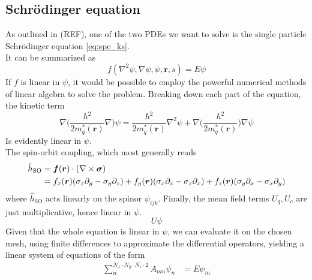 \subsection{Schr\"odinger equation}
As outlined in (REF), one of the two PDEs we want to solve is the single particle Schr\"odinger equation \ref{eq:spe_ks}.
\\It can be summarized as
\begin{equation}
    \label{eq:pde} f(\nabla^2 \psi, \nabla \psi, \psi, \bm r, s) = E\psi
\end{equation}
If $f$ is linear in $\psi$, it would be possible to employ the powerful numerical methods of linear algebra to solve the problem.
Breaking down each part of the equation, the kinetic term
\begin{equation}
\label{eq:kin_lin_dim}
\nabla\bigg(\frac{\hbar^2}{2m^{*}_q(\mathbf r)}\nabla \bigg)\psi = \frac{\hbar^2}{2m^{*}_q(\mathbf r)} \nabla^2\psi + \nabla\bigg(\frac{\hbar^2}{2m^{*}_q(\mathbf r)}\bigg) \nabla\psi
\end{equation}
Is evidently linear in $\psi$. 
\\The spin-orbit coupling, which most generally reads
\begin{align*}
    \hat {{h}}_{\text{SO}}&=\bm f (\bm r )\cdot (\nabla \times \boldsymbol{\sigma} ) 
    \\&=f_x(\bm r)(\sigma_z\partial_y - \sigma_y\partial_z) + f_y(\bm r)(\sigma_x\partial_z - \sigma_z\partial_x) + f_z(\bm r)(\sigma_y\partial_x - \sigma_x\partial_y)
\end{align*}
where $\hat {h}_\text{SO}$ acts linearly on the spinor $\psi_{ijk}$.
Finally, the mean field terms $U_q, U_c$ are just multiplicative, hence linear in $\psi$.
\begin{equation*}
    U\psi
\end{equation*}
Given that the whole equation is linear in $\psi$, we can evaluate it on the chosen mesh, using finite differences to approximate the differential operators, yielding a linear system of equations of the form
\begin{align}
    \sum_n^{N_x\cdot N_y\cdot N_z \cdot 2} A_{mn}\psi_{n} &= E\psi_m
\end{align}
